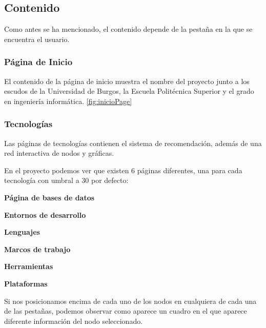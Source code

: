 
\subsection{Contenido}
Como antes se ha mencionado, el contenido depende de la pestaña en la que se encuentra el usuario.

\subsubsection{Página de Inicio}
El contenido de la página de inicio muestra el nombre del proyecto junto a los escudos de la Universidad de Burgos, la Escuela Politécnica Superior y el grado en ingeniería informática. \ref{fig:inicioPage}


\subsubsection{Tecnologías}
Las páginas de tecnologías contienen el sistema de recomendación, además de una red interactiva de nodos y gráficas.

En el proyecto podemos ver que existen 6 páginas diferentes, una para cada tecnología con umbral a 30 por defecto:

\newpage
\textbf{Página de bases de datos}

\newpage
\textbf{Entornos de desarrollo}

\newpage
\textbf{Lenguajes}

\newpage
\textbf{Marcos de trabajo}

\newpage
\textbf{Herramientas}

\newpage
\textbf{Plataformas}

\newpage
Si nos posicionamos encima de cada uno de los nodos en cualquiera de cada una de las pestañas, podemos observar como aparece un cuadro en el que aparece diferente información del nodo seleccionado.


